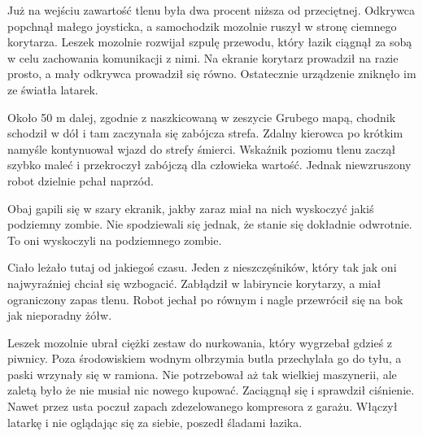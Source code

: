Już na wejściu zawartość tlenu była dwa procent niższa od przeciętnej.
Odkrywca popchnął małego joysticka, a samochodzik mozolnie ruszył w stronę ciemnego korytarza.
Leszek mozolnie rozwijał szpulę przewodu, który łazik ciągnął za sobą w celu zachowania komunikacji z nimi.
Na ekranie korytarz prowadził na razie prosto, a mały odkrywca prowadził się równo. Ostatecznie urządzenie zniknęło im ze światła latarek.

Około 50 m dalej, zgodnie z naszkicowaną w zeszycie Grubego mapą, chodnik schodził w dół i tam zaczynała się zabójcza strefa.
Zdalny kierowca po krótkim namyśle kontynuował wjazd do strefy śmierci. Wskaźnik poziomu tlenu zaczął szybko maleć i przekroczył zabójczą dla człowieka wartość.
Jednak niewzruszony robot dzielnie pchał naprzód.

Obaj gapili się w szary ekranik, jakby zaraz miał na nich wyskoczyć jakiś podziemny zombie.
Nie spodziewali się jednak, że stanie się dokładnie odwrotnie. To oni wyskoczyli na podziemnego zombie.

Ciało leżało tutaj od jakiegoś czasu. Jeden z nieszczęśników, który tak jak oni najwyraźniej chciał się wzbogacić.
Zabłądził w labiryncie korytarzy, a miał ograniczony zapas tlenu.
Robot jechał po równym i nagle przewrócił się na bok jak nieporadny żółw.

Leszek mozolnie ubrał ciężki zestaw do nurkowania, który wygrzebał gdzieś z piwnicy.
Poza środowiskiem wodnym olbrzymia butla przechylała go do tyłu, a paski wrzynały się w ramiona.
Nie potrzebował aż tak wielkiej maszynerii, ale zaletą było że nie musiał nic nowego kupować.
Zaciągnął się i sprawdził ciśnienie. Nawet przez usta poczuł zapach zdezelowanego kompresora z garażu.
Włączył latarkę i nie oglądając się za siebie, poszedł śladami łazika.

